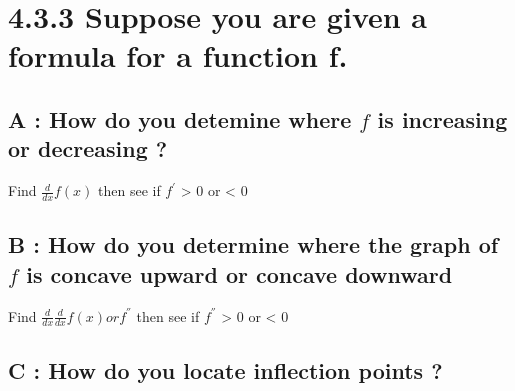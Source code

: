 \section*{4.3.3
    \textbf{
        Suppose you are given a formula for a function f.
    }
}

\subsection*{A : How do you detemine where $f$ is increasing or decreasing ?}

Find $
\frac{d}{dx}f(x) $ then see if $f^{'}$ > 0 or < 0

\subsection*{B : How do you determine where the graph of $f$ is concave upward or concave downward}


Find $
\frac{d}{dx}\frac{d}{dx}f(x) or f^{''}$ then see if $f^{''}$ > 0 or < 0


\subsection*{C : How do you locate inflection points ?}
